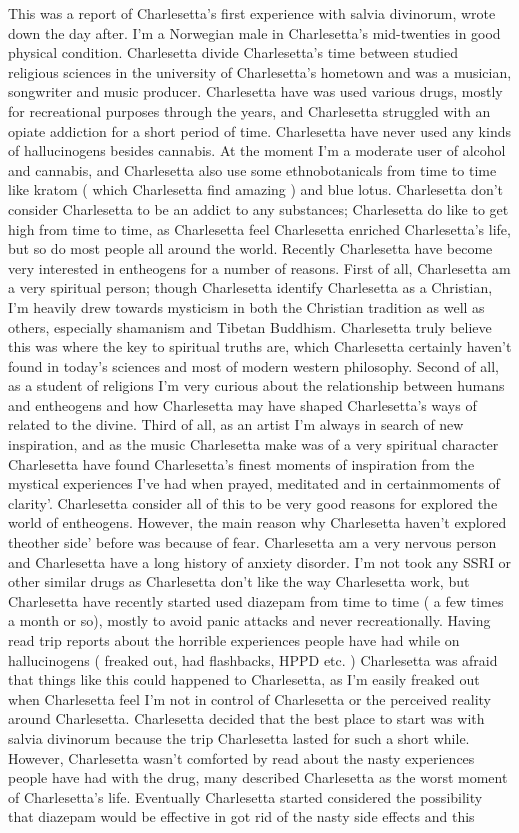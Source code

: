 \documentclass[12pt]{book}
\begin{document}
This was a report of Charlesetta's first experience with salvia divinorum, wrote down the day after. I'm a Norwegian male in Charlesetta's mid-twenties in good physical condition. Charlesetta divide Charlesetta's time between studied religious sciences in the university of Charlesetta's hometown and was a musician, songwriter and music producer. Charlesetta have was used various drugs, mostly for recreational purposes through the years, and Charlesetta struggled with an opiate addiction for a short period of time. Charlesetta have never used any kinds of hallucinogens besides cannabis. At the moment I'm a moderate user of alcohol and cannabis, and Charlesetta also use some ethnobotanicals from time to time like kratom ( which Charlesetta find amazing ) and blue lotus. Charlesetta don't consider Charlesetta to be an addict to any substances; Charlesetta do like to get high from time to time, as Charlesetta feel Charlesetta enriched Charlesetta's life, but so do most people all around the world. Recently Charlesetta have become very interested in entheogens for a number of reasons. First of all, Charlesetta am a very spiritual person; though Charlesetta identify Charlesetta as a Christian, I'm heavily drew towards mysticism in both the Christian tradition as well as others, especially shamanism and Tibetan Buddhism. Charlesetta truly believe this was where the key to spiritual truths are, which Charlesetta certainly haven't found in today's sciences and most of modern western philosophy. Second of all, as a student of religions I'm very curious about the relationship between humans and entheogens and how Charlesetta may have shaped Charlesetta's ways of related to the divine. Third of all, as an artist I'm always in search of new inspiration, and as the music Charlesetta make was of a very spiritual character Charlesetta have found Charlesetta's finest moments of inspiration from the mystical experiences I've had when prayed, meditated and in certainmoments of clarity'. Charlesetta consider all of this to be very good reasons for explored the world of entheogens. However, the main reason why Charlesetta haven't explored theother side' before was because of fear. Charlesetta am a very nervous person and Charlesetta have a long history of anxiety disorder. I'm not took any SSRI or other similar drugs as Charlesetta don't like the way Charlesetta work, but Charlesetta have recently started used diazepam from time to time ( a few times a month or so), mostly to avoid panic attacks and never recreationally. Having read trip reports about the horrible experiences people have had while on hallucinogens ( freaked out, had flashbacks, HPPD etc. ) Charlesetta was afraid that things like this could happened to Charlesetta, as I'm easily freaked out when Charlesetta feel I'm not in control of Charlesetta or the perceived reality around Charlesetta. Charlesetta decided that the best place to start was with salvia divinorum because the trip Charlesetta lasted for such a short while. However, Charlesetta wasn't comforted by read about the nasty experiences people have had with the drug, many described Charlesetta as the worst moment of Charlesetta's life. Eventually Charlesetta started considered the possibility that diazepam would be effective in got rid of the nasty side effects and this 
\end{document}
